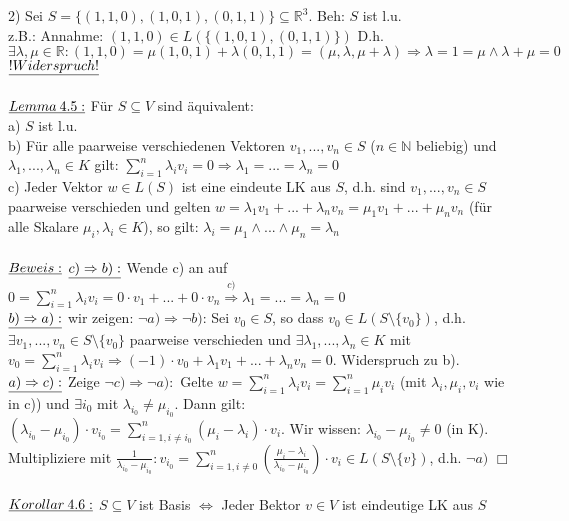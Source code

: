 \documentclass[fleqn, a4paper, 11pt]{article}
\begin{document}
2) Sei $S=\{(1,1,0),(1,0,1),(0,1,1)\}\subseteq\mathbb{R}^3$. Beh: $S$ ist l.u.\\
z.B.: Annahme: $(1,1,0)\in L(\{(1,0,1),(0,1,1)\})$ D.h. $\exists\lambda,\mu\in\mathbb{R}:(1,1,0)=\mu(1,0,1)+\lambda(0,1,1)=(\mu,\lambda,\mu+\lambda)\Rightarrow\lambda=1=\mu\wedge\lambda+\mu=0$ $\uline{!Widerspruch!}$\\
\\
$\uline{Lemma\:4.5:}$ F\"ur $S\subseteq V$ sind \"aquivalent:\\
a) $S$ ist l.u.\\
b) F\"ur alle paarweise verschiedenen Vektoren $v_1,...,v_n\in S$ ($n\in\mathbb{N}$ beliebig) und $\lambda_1,...,\lambda_n\in K$ gilt: $\sum\limits_{i=1}^n \lambda_i v_i = 0\Rightarrow \lambda_1 =...=\lambda_n =0$\\
c) Jeder Vektor $w\in L(S)$ ist eine eindeute LK aus $S$, d.h. sind $v_1,...,v_n \in S$ paarweise verschieden und gelten $w=\lambda_1 v_1 +...+\lambda_n v_n =\mu_1 v_1 +...+ \mu_n v_n$ (f\"ur alle Skalare $\mu_i,\lambda_i \in K$), so gilt: $\lambda_i = \mu_1\wedge ... \wedge \mu_n =\lambda_n$\\
\\
$\uline{Beweis:}$ $\uline{c)\Rightarrow b):}$ Wende c) an auf $0=\sum\limits_{i=1}^n \lambda_i v_i =0\cdot v_1 +...+0\cdot v_n \stackrel{c)}{\Rightarrow} \lambda_1 =...= \lambda_n =0$\\
$\uline{b) \Rightarrow a):}$ wir zeigen: $\neg a)\Rightarrow \neg b)$: Sei $v_0 \in S$, so dass $v_0 \in L(S\setminus\{v_0\})$, d.h. $\exists v_1,...,v_n \in S\setminus\{v_0\}$ paarweise verschieden und $\exists \lambda_1,...,\lambda_n \in K$ mit $v_0 =\sum\limits_{i=1}^n \lambda_i v_i \Rightarrow (-1)\cdot v_0 +\lambda_1 v_1 +...+ \lambda_n v_n =0$. Widerspruch zu b).\\
$\uline{a)\Rightarrow c):}$ Zeige $\neg c)\Rightarrow\neg a):$ Gelte $w=\sum\limits_{i=1}^n \lambda_i v_i = \sum\limits_{i=1}^n \mu_i v_i$ (mit $\lambda_i,\mu_i,v_i$ wie in c)) und $\exists i_0$ mit $\lambda_{i_0} \neq \mu_{i_0}$. Dann gilt: $(\lambda_{i_0} -\mu_{i_0})\cdot v_{i_0} =\sum\limits_{i=1,i\neq i_0}^n (\mu_i -\lambda_i)\cdot v_i$. Wir wissen: $\lambda_{i_0}-\mu_{i_0}\neq 0$ (in K). Multipliziere mit $\tfrac{1}{\lambda_{i_0}-\mu_{i_0}}:v_{i_0}=\sum\limits_{i=1,i\neq 0}^n (\tfrac{\mu_i -\lambda_i}{\lambda_{i_0} -\mu_{i_0}})\cdot v_i \in L(S\setminus\{v\})$, d.h. $\neg a)$ \hfill $\Box$\\
\\
$\uline{Korollar\:4.6:}$ $S\subseteq V$ ist Basis $\Leftrightarrow$ Jeder Bektor $v\in V$ ist eindeutige LK aus $S$\\
\end{document}
